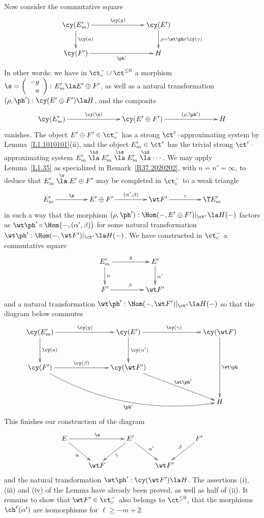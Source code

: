 \documentclass[11pt]{amsart}
\begin{document}
Now consider the commutative square
  \[\xymatrix@C+50pt{
    \cy(E'_m) \ar[r]^-{\cy(g)}
    \ar[d]^-{\cy(a)}& \cy(E') \ar[d]^{\rho=\wt\ph\circ\cy(\gamma)}\\
  \cy(F') \ar[r]_-{\ph'}  & H
}\]
In other words: we have in $\ct^-_c\cup\ct^{\leq0}$ a morphism 
$\s=\left(\begin{array}{r}
-g\\ a
\end{array}\right)\colon E'_m \la E'\oplus F'$,
as well as a natural transformation $(\rho,\ph'):\cy(E'\oplus
F')\la H$, and the composite
 \[\xymatrix@C+50pt{
    \cy(E'_m) \ar[r]^-{\cy(\s)}
    & \cy(E'\oplus F') \ar[r]^-{(\rho,\ph')} &
  H
}\]
 vanishes. The object $E'\oplus F'\in\ct^-_c$ has a strong
 $\ct^c$--approximating system by Lemma~\ref{L1.1010101}(ii),
 and the object $E'_m\in\ct^c$ has the trivial strong
 $\ct^c$--approximating system
$E'_m\stackrel\id\la E'_m\stackrel\id\la E'_m\stackrel\id\la\cdots$.
We may apply Lemma~\ref{L1.35} as specialized in Remark~\ref{R37.2020202},
with $n=n'=\infty$, to
deduce that $E'_m\stackrel\s\la E'\oplus F'$ may be completed in $\ct^-_c$
to a 
weak triangle
\[\xymatrix@C+20pt{
  E'_m \ar[r]^-{\s} & E'\oplus F' \ar[r]^-{(\alpha',\beta)} &\wt F'
  \ar[r]^-{\tau} &\T E'_m
}\]
in such a way that the morphism $(\rho,\ph'):\Hom(-,E'\oplus
F')|_{\ct^c}\la H(-)$ factors as
$\wt\ph'\circ\Hom\big(-,(\alpha',\beta)\big)$ for some natural
transformation
$\wt\ph':\Hom(-,\wt F')|_{\ct^c}\la H(-)$.
We have constructed in $\ct^-_c$ a commutative square
\[\xymatrix@C+20pt{
  E'_m \ar[r]^-{g}\ar[d]^a & E'\ar[d]^{\alpha'} \\
F'\ar[r]^\beta & \wt F'
}\] 
and a natural transformation
$\wt\ph':\Hom(-,\wt F')|_{\ct^c}\la H(-)$
so that the diagram below commutes
\[\xymatrix@C+50pt@R+10pt{
    \cy(E'_m) \ar[r]^-{\cy(g)}
    \ar[d]^-{\cy(a)}& \cy(E') \ar[r]^{\cy(\gamma)}
    \ar[d]^-{\cy(\alpha')}
    & \cy(\wt F) \ar[dd]^{\wt\ph}\\
    \cy(F') \ar@/_2pc/[rrd]_-{\ph'}\ar[r]^-{\cy(\beta)}
    & \cy(\wt F') \ar[rd]^-{\wt\ph'}  &  \\
 & & H
}\]
This finishes our construction of the diagram 
\[\xymatrix{
E\ar[rr]^{\e}\ar[dr]_{\alpha}&  &\ar[dl]^{\gamma} E'\ar[dr]^{\alpha'} & & F'\ar[dl]_-{\beta} \\
& \wt F &                 & \wt F'
}\]
and the natural transformation
$\wt\ph':\cy(\wt F')\la H$. The assertions (i), (iii) and
(iv) of the Lemma have already been proved, as well as half of (ii). It remains
to show that $\wt F'\in\ct^-_c$ also belongs to $\ct^{\leq0}$, that
the morphisms $\ch^\ell(\alpha')$ are isomorphisms for $\ell\geq-m+2$.
\end{document}
